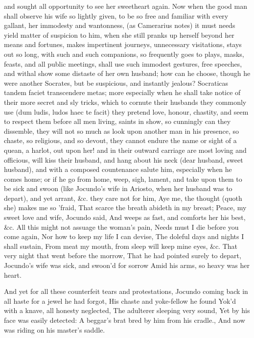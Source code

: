 {and sought all opportunity to see her sweetheart again. Now when the
good man shall observe his wife so lightly given, to be so free and
familiar with every gallant, her immodesty and wantonness, (as
Camerarius notes) it must needs yield matter of suspicion to him,
when she still pranks up herself beyond her means and fortunes, makes
impertinent journeys, unnecessary visitations, stays out so long, with
such and such companions, so frequently goes to plays, masks, feasts,
and all public meetings, shall use such immodest gestures, free
speeches, and withal show some distaste of her own husband; how can he
choose, though he were another Socrates, but be suspicious, and
instantly jealous?  Socraticas tandem faciet transcendere metas;
more especially when he shall take notice of their more secret and sly
tricks, which to cornute their husbands they commonly use (dum ludis,
ludos haec te facit) they pretend love, honour, chastity, and seem to
respect them before all men living, saints in show, so cunningly can
they dissemble, they will not so much as look upon another man in his
presence, so chaste, so religious, and so devout, they cannot
endure the name or sight of a quean, a harlot, out upon her! and in
their outward carriage are most loving and officious, will kiss their
husband, and hang about his neck (dear husband, sweet husband), and
with a composed countenance salute him, especially when he comes home;
or if he go from home, weep, sigh, lament, and take upon them to be
sick and swoon (like Jocundo's wife in Ariosto, when her husband
was to depart), and yet arrant, \&c. they care not for him,
Aye me, the thought (quoth she) makes me so 'fraid,
That scarce the breath abideth in my breast;
Peace, my sweet love and wife, Jocundo said,
And weeps as fast, and comforts her his best, \&c.
All this might not assuage the woman's pain,
Needs must I die before you come again,
Nor how to keep my life I can devise,
The doleful days and nights I shall sustain,
From meat my mouth, from sleep will keep mine eyes, \&c.
That very night that went before the morrow,
That he had pointed surely to depart,
Jocundo's wife was sick, and swoon'd for sorrow
Amid his arms, so heavy was her heart.

And yet for all these counterfeit tears and protestations, Jocundo
coming back in all haste for a jewel he had forgot,
His chaste and yoke-fellow he found
Yok'd with a knave, all honesty neglected,
The adulterer sleeping very sound,
Yet by his face was easily detected:
A beggar's brat bred by him from his cradle.,
And now was riding on his master's saddle.

}
